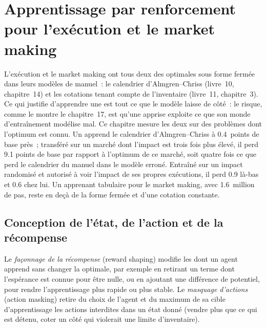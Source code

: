 \chapter{Apprentissage par renforcement pour l'exécution et le market making}\label{ch:ml:reinforcement-learning-for-execution-and-market-making}

L'exécution et le market making ont tous deux des  optimales sous forme fermée dans leurs modèles de manuel~: le calendrier d'Almgren--Chriss
(livre~10, chapitre~14) et les cotations tenant compte de l'inventaire (livre~11, chapitre~3). Ce qui justifie d'apprendre une 
est tout ce que le modèle laisse de côté~: le risque, comme le montre le chapitre~17, est qu'une  apprise exploite ce que son
monde d'entraînement modélise mal. Ce chapitre mesure les deux sur des problèmes dont l'optimum est connu. Un  apprend le
calendrier d'Almgren--Chriss à 0.4~points de base près~; transféré sur un marché dont l'impact est trois fois plus élevé, il perd 9.1
points de base par rapport à l'optimum de ce marché, soit quatre fois ce que perd le calendrier du manuel dans le modèle erroné. Entraîné sur un impact randomisé
et autorisé à voir l'impact de ses propres exécutions, il perd 0.9 là-bas et 0.6 chez lui. Un apprenant tabulaire pour le market
making, avec 1.6~million de pas, reste en deçà de la forme fermée et d'une cotation constante.

\section{Conception de l'état, de l'action et de la récompense}

\begin{definition}\label{def:ml:reinforcement-learning-for-execution-and-market-making:design}
Le \emph{façonnage de la récompense} (reward shaping) modifie les  dont un agent apprend sans changer la 
optimale, par exemple en retirant un terme dont l'espérance est connue pour être nulle, ou en ajoutant une différence de potentiel, pour rendre
l'apprentissage plus rapide ou plus stable. Le \emph{masquage d'actions} (action masking) retire du choix de l'agent et du
maximum de sa cible d'apprentissage les actions interdites dans un état donné (vendre plus que ce qui est détenu,
coter un côté qui violerait une limite d'inventaire).
\end{definition}

